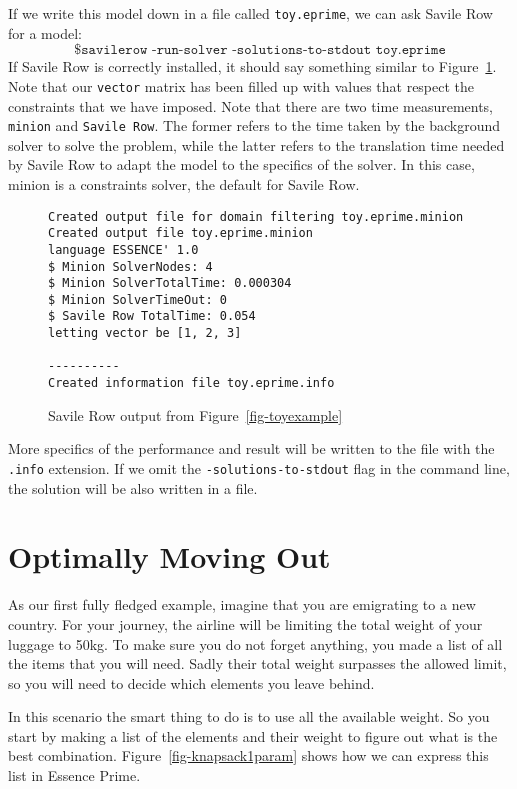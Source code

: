 If we write this model down in a file called \texttt{toy.eprime}, we can ask
Savile Row for a model:
$$\texttt{\$savilerow -run-solver -solutions-to-stdout toy.eprime}$$
If Savile Row is correctly installed, it should say something similar to
Figure~\ref{fig-output1}. Note that our \texttt{vector} matrix has been filled
up with values that respect the constraints that we have imposed. Note that
there are two time measurements, \texttt{minion} and \texttt{Savile Row}. The
former refers to the time taken by the background solver to solve the problem,
while the latter refers to the translation time needed by Savile Row to adapt
the model to the specifics of the solver. In this case, minion is a constraints
solver, the default for Savile Row.

\begin{figure}
\begin{verbatim}
Created output file for domain filtering toy.eprime.minion
Created output file toy.eprime.minion
language ESSENCE' 1.0  
$ Minion SolverNodes: 4 
$ Minion SolverTotalTime: 0.000304 
$ Minion SolverTimeOut: 0   
$ Savile Row TotalTime: 0.054
letting vector be [1, 2, 3]

----------
Created information file toy.eprime.info
\end{verbatim}
    \caption{Savile Row output from Figure~\ref{fig-toyexample}}
    \label{fig-output1}
\end{figure}

More specifics of the performance and result will be written to the file with
the \texttt{.info} extension. If we omit the \texttt{-solutions-to-stdout} flag
in the command line, the solution will be also written in a file.

\section{Optimally Moving Out}

As our first fully fledged example, imagine that you are emigrating to a new country. For
your journey, the airline will be limiting the total weight of your luggage to
50kg.  To make sure you do not forget anything, you made a list of all the
items that you will need. Sadly their total weight surpasses the allowed limit,
so you will need to decide which elements you leave behind.

In this scenario the smart thing to do is to use all the available weight. So
you start by making a list of the elements and their weight to figure out what
is the best combination. 
Figure~\ref{fig-knapsack1param} shows how we can express this list in Essence Prime.

